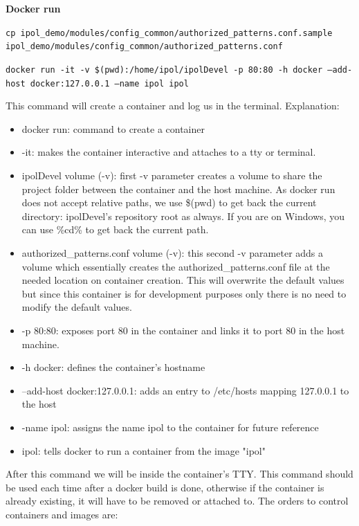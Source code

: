 \documentclass[a4paper,12pt]{article}
\begin{document}
\textbf{Docker run}

  {\tt cp ipol\_demo/modules/config\_common/authorized\_patterns.conf.sample ipol\_demo/modules/config\_common/authorized\_patterns.conf}
  
  {\tt docker run -it -v \$(pwd):/home/ipol/ipolDevel -p 80:80 -h docker --add-host docker:127.0.0.1 --name ipol ipol}

This command will create a container and log us in the terminal. Explanation:
\begin{itemize}
  \item docker run: command to create a container
  \item -it: makes the container interactive and attaches to a tty or terminal.
  \item ipolDevel volume (-v): first -v parameter creates a volume to share the project folder between the container and the host machine.
  As docker run does not accept relative paths, we use \$(pwd) to get back the current directory: ipolDevel's repository root as always. If you are on
  Windows, you can use \%cd\% to get back the current path. 
  \item authorized\_patterns.conf volume (-v): this second -v parameter adds a volume which essentially creates the authorized\_patterns.conf file at the 
  needed location on container creation. 
  This will overwrite the default values but since this container is for development purposes only there is no need to modify the default values.
  \item -p 80:80: exposes port 80 in the container and links it to port 80 in the host machine.
  \item -h docker: defines the container's hostname
  \item --add-host docker:127.0.0.1: adds an entry to /etc/hosts mapping 127.0.0.1 to the host
  \item -name ipol: assigns the name ipol to the container for future reference
  \item ipol: tells docker to run a container from the image "ipol"
\end{itemize}

After this command we will be inside the container's TTY. This command should be used each time after a docker build is done,
otherwise if the container is already existing, it will have to be removed or attached to. The orders to control containers and images are:
\end{document}
